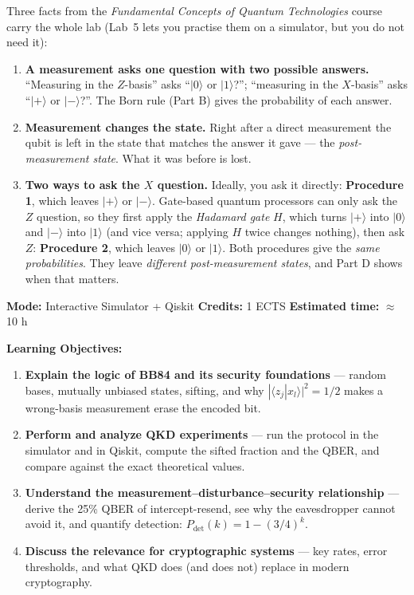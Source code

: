 \documentclass[a4paper,11pt]{article}
\providecommand{\ket}[1]{|#1\rangle}
\providecommand{\braket}[2]{\langle#1|#2\rangle}
\begin{document}
\begin{factsbox}
Three facts from the \textit{Fundamental Concepts of Quantum Technologies} course carry
the whole lab (Lab~5 lets you practise them on a simulator, but you do not need it):
\begin{enumerate}
    \item \textbf{A measurement asks one question with two possible answers.}
          ``Measuring in the $Z$-basis'' asks ``$\ket{0}$ or $\ket{1}$?''; ``measuring in
          the $X$-basis'' asks ``$\ket{+}$ or $\ket{-}$?''. The Born rule (Part B) gives
          the probability of each answer.
    \item \textbf{Measurement changes the state.} Right after a direct measurement the
          qubit is left in the state that matches the answer it gave --- the
          \emph{post-measurement state}. What it was before is lost.
    \item \textbf{Two ways to ask the $X$ question.} Ideally, you ask it directly:
          \textbf{Procedure 1}, which leaves $\ket{+}$ or $\ket{-}$. Gate-based quantum
          processors can only ask the $Z$ question, so they first apply the
          \emph{Hadamard gate} $H$, which turns $\ket{+}$ into $\ket{0}$ and $\ket{-}$
          into $\ket{1}$ (and vice versa; applying $H$ twice changes nothing), then ask
          $Z$: \textbf{Procedure 2}, which leaves $\ket{0}$ or $\ket{1}$. Both procedures
          give the \emph{same probabilities}. They leave \emph{different
          post-measurement states}, and Part D shows when that matters.
\end{enumerate}
\end{factsbox}

\noindent\textbf{Mode:} Interactive Simulator + Qiskit \quad\textbf{Credits:} 1 ECTS
\quad\textbf{Estimated time:} $\approx$ 10 h

\vspace{0.3cm}
\noindent\textbf{Learning Objectives:}
\begin{enumerate}
    \item \textbf{Explain the logic of BB84 and its security foundations} --- random
          bases, mutually unbiased states, sifting, and why
          $|\braket{z_j}{x_l}|^2 = 1/2$ makes a wrong-basis measurement erase the
          encoded bit.
    \item \textbf{Perform and analyze QKD experiments} --- run the protocol in the
          simulator and in Qiskit, compute the sifted fraction and the QBER, and
          compare against the exact theoretical values.
    \item \textbf{Understand the measurement--disturbance--security relationship} ---
          derive the 25\% QBER of intercept-resend, see why the eavesdropper cannot
          avoid it, and quantify detection: $P_{\text{det}}(k) = 1 - (3/4)^k$.
    \item \textbf{Discuss the relevance for cryptographic systems} --- key rates,
          error thresholds, and what QKD does (and does not) replace in modern
          cryptography.
\end{enumerate}
\end{document}
